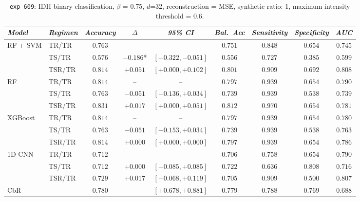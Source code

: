 \begin{table}[H]
\centering
\scriptsize

\label{tab:ctrl_exp_609}
\begin{tabular*}{\textwidth}{@{\extracolsep{\fill}}llccccccc}
\toprule
\emph{Model} & \emph{Regimen} & \emph{Accuracy} & \emph{$\Delta$} & \emph{95\% CI} & \emph{Bal.\ Acc} & \emph{Sensitivity} & \emph{Specificity} & \emph{AUC}\\
\midrule
\multirow{3}{*}{RF + SVM} & TR/TR & $0.763$ & -- & -- & $0.751$ & $0.848$ & $0.654$ & $0.745$\\
 & TS/TR & $0.576$ & $-0.186$* & $[-0.322, -0.051]$ & $0.556$ & $0.727$ & $0.385$ & $0.599$\\
 & TSR/TR & $0.814$ & $+0.051$ & $[+0.000, +0.102]$ & $0.801$ & $0.909$ & $0.692$ & $0.808$\\
\midrule
\multirow{3}{*}{RF} & TR/TR & $0.814$ & -- & -- & $0.797$ & $0.939$ & $0.654$ & $0.790$\\
 & TS/TR & $0.763$ & $-0.051$ & $[-0.136, +0.034]$ & $0.739$ & $0.939$ & $0.538$ & $0.739$\\
 & TSR/TR & $0.831$ & $+0.017$ & $[+0.000, +0.051]$ & $0.812$ & $0.970$ & $0.654$ & $0.781$\\
\midrule
\multirow{3}{*}{XGBoost} & TR/TR & $0.814$ & -- & -- & $0.797$ & $0.939$ & $0.654$ & $0.780$\\
 & TS/TR & $0.763$ & $-0.051$ & $[-0.153, +0.034]$ & $0.739$ & $0.939$ & $0.538$ & $0.763$\\
 & TSR/TR & $0.814$ & $+0.000$ & $[+0.000, +0.000]$ & $0.797$ & $0.939$ & $0.654$ & $0.786$\\
\midrule
\multirow{3}{*}{1D-CNN} & TR/TR & $0.712$ & -- & -- & $0.706$ & $0.758$ & $0.654$ & $0.790$\\
 & TS/TR & $0.712$ & $+0.000$ & $[-0.085, +0.085]$ & $0.722$ & $0.636$ & $0.808$ & $0.716$\\
 & TSR/TR & $0.729$ & $+0.017$ & $[-0.068, +0.119]$ & $0.705$ & $0.909$ & $0.500$ & $0.807$\\
\midrule
CbR & -- & $0.780$ & -- & $[+0.678, +0.881]$ & $0.779$ & $0.788$ & $0.769$ & $0.688$\\
\bottomrule
\end{tabular*}
\caption{\small \texttt{exp\_609}: IDH binary classification, $\beta$ = 0.75, $d$=32, reconstruction = MSE, synthetic ratio: 1, maximum intensity threshold = 0.6.}
\end{table}

